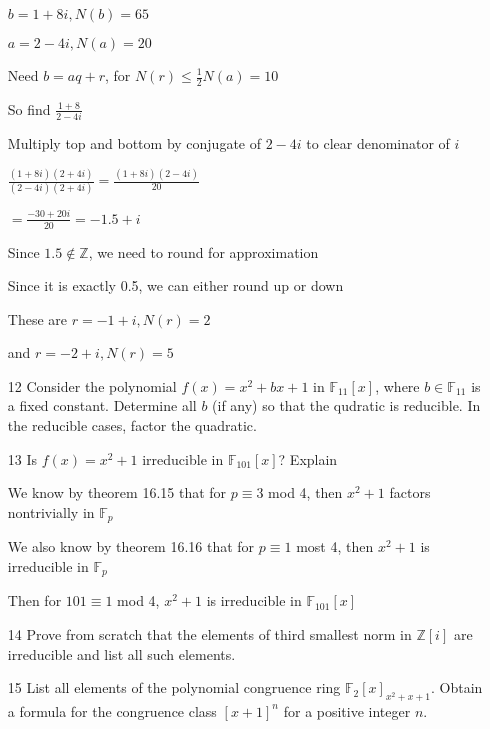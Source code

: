 \documentclass[12pt]{article}
\begin{document}
\begin{itemize}
		$b = 1 + 8i, N(b) = 65$

		$a = 2 - 4i, N(a) = 20$

		Need $b = aq + r$, for $N(r) \leq \frac{1}{2} N(a) = 10$

		So find $\frac{1+8}{2-4i}$

		Multiply top and bottom by conjugate of $2-4i$ to clear denominator of $i$

		$\frac{(1+8i)(2+4i)}{(2-4i)(2+4i)} = \frac{(1+8i)(2-4i)}{20}$

		$=\frac{-30+20i}{20} = -1.5 + i$

		Since $1.5 \not \in \mathbb{Z}$, we need to round for approximation

		Since it is exactly 0.5, we can either round up or down

		These are $r = -1 + i, N(r) = 2$

		and $r = -2 + i, N(r) = 5$

	\item[12] Consider the polynomial $f(x) = x^2 + bx + 1$ in $\mathbb{F}_{11}[x]$, where $b\in \mathbb{F}_{11}$ is a fixed constant. Determine all $b$ (if any) so that the qudratic is reducible. In the reducible cases, factor the quadratic.

	\item[13] Is $f(x) = x^2 + 1$ irreducible in $\mathbb{F}_{101}[x]$? Explain

		We know by theorem 16.15 that for $p \equiv 3$ mod 4, then $x^2 + 1$ factors nontrivially in $\mathbb{F}_p$

		We also know by theorem 16.16 that for $p \equiv 1$ most 4, then $x^2 + 1$ is irreducible in $\mathbb{F}_p$

		Then for $101 \equiv 1$ mod 4, $x^2 + 1$ is irreducible in $\mathbb{F}_{101}[x]$

	\item[14] Prove from scratch that the elements of third smallest norm in $\mathbb{Z}[i]$ are irreducible and list all such elements.

	\item[15] List all elements of the polynomial congruence ring $\mathbb{F}_2[x]_{x^2 + x + 1}$. Obtain a formula for the congruence class $[x+1]^n$ for a positive integer $n$.
\end{itemize}
\end{document}
